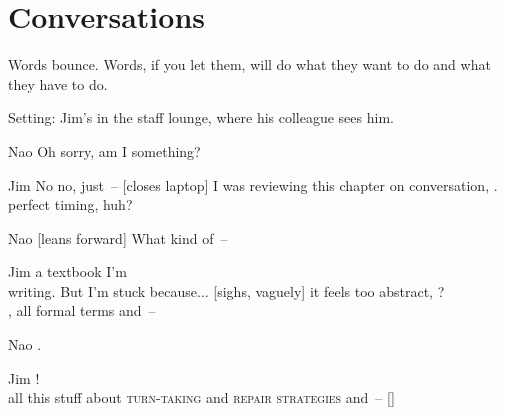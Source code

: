 \chapter{Conversations} \label{ch:conversations}

\epigraph{Words bounce. Words, if you let them, will do what they want to do and what they have to do.}{}

\begin{adjustwidth}{0pt}{1.1in} 
\setlength{\marginparwidth}{1.6in}
\setlength{\marginparsep}{-0.8in}
\noindent
Setting: Jim's in the staff lounge, where his colleague sees him.

\begin{sloppypar}
\begin{dialogue}
\item[Nao] Oh sorry, am I  something?

\item[Jim] No no, just~-- [closes laptop] I was reviewing this chapter on conversation, . \\ perfect timing, huh?

\item[Nao] [leans forward]  What kind of~-- 

\item[Jim] \hfill{} a textbook I'm\\ writing. But I'm stuck because... [sighs, vaguely] it feels too abstract, ? \\, all formal terms and~-- 

\item[Nao] \hspace{3cm} .\\

\item[Jim] ! \\ all this stuff about \textsc{turn-taking} and \textsc{repair strategies} and~-- []


\end{dialogue}
\end{sloppypar}
\end{adjustwidth}
